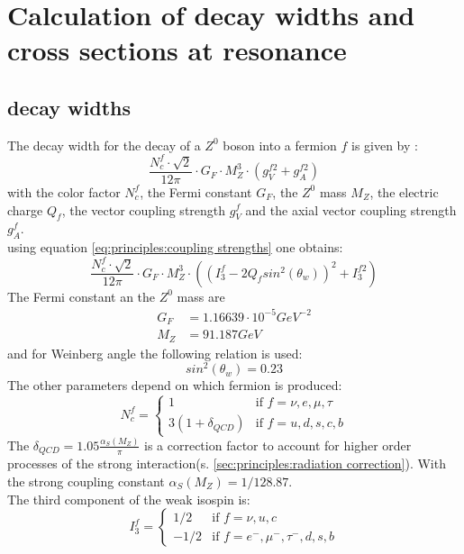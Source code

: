 \section{Calculation of decay widths and cross sections at resonance}
\subsection{decay widths}
The decay width for the decay of a $Z^0$ boson into a fermion $f$ is given by \cite{muenchen}:
\begin{equation}
\frac{N_c^f \cdot \sqrt{2}}{12\pi}\cdot G_F \cdot M_Z^3 \cdot (g_V^{f2}+g_A^{f2})
\end{equation}
with the color factor $N_c^f$, the Fermi constant $G_F$, the $Z^0$ mass $M_Z$, the electric charge $Q_f$, the vector coupling strength $g_V^f$ and the axial vector coupling strength $g_A^f$.\\
using equation \ref{eq:principles:coupling strengths} one obtains:
\begin{equation}
\frac{N_c^f \cdot \sqrt{2}}{12\pi}\cdot G_F \cdot M_Z^3 \cdot \left( \left( I^f_3-2 Q_f sin^2(\theta_w)\right)^2+I^{f2}_3 \right)
\label{eq:appendix:decay width}
\end{equation}
The Fermi constant an the  $Z^0$ mass are\cite{muenchen}
\begin{equation}
\begin{aligned}
G_F &= 1.16639\cdot 10^{-5}GeV^{-2}\\
M_Z &= 91.187 GeV
\end{aligned}
\end{equation}
and for Weinberg angle the following relation is used\cite{Grif}:
\begin{equation}
sin^2(\theta_w)=0.23 
\end{equation}
The other parameters depend on which fermion is produced:
\begin{equation}
N_c^f = \begin{cases}
1 & \text{if } f = \nu,e,\mu,\tau\\
3(1+\delta_{QCD}) & \text{if } f = u,d,s,c,b
\end{cases}
\end{equation}
The $\delta_{QCD}= 1.05 \frac{\alpha_S(M_Z)}{\pi}$ is a correction factor to account  for higher order processes of the strong interaction(s. \ref{sec:principles:radiation correction}). With the strong coupling constant $\alpha_S(M_Z)=1/128.87$.\\
The third component of the weak isospin is:
\begin{equation}
I^f_3 = \begin{cases}
1/2 & \text{if } f = \nu,u,c\\
-1/2 & \text{if } f = e^-,\mu^-,\tau^-,d,s,b
\end{cases}
\end{equation}
